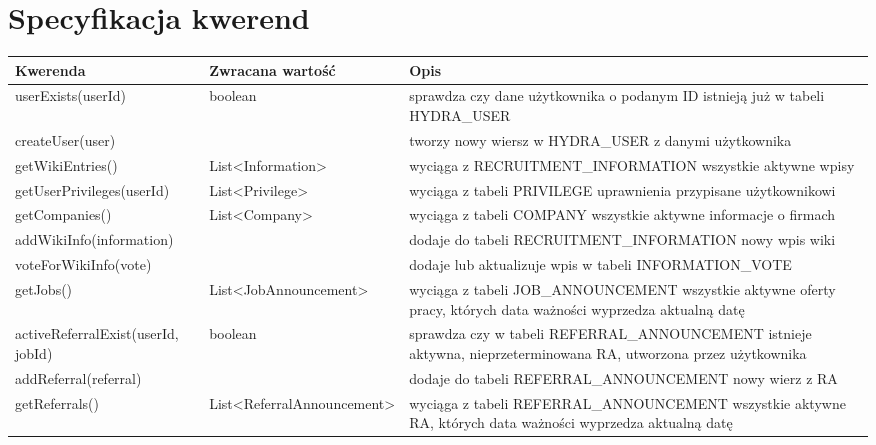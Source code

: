 \documentclass[oneside]{scrreprt}
\begin{document}
\section{Specyfikacja kwerend}
\begin{table}[ht]
	\centering
	\begin{tabular}{p{4.5cm}|p{5cm}|p{7cm}}
		\textbf{Kwerenda} & \textbf{Zwracana wartość} & \textbf{Opis} \\ \hline
		userExists(userId) & boolean & sprawdza czy dane użytkownika o podanym ID istnieją już w tabeli HYDRA\_USER \\ \hline
		createUser(user) &  & tworzy nowy wiersz w HYDRA\_USER z danymi użytkownika \\ \hline
		getWikiEntries() & List\textless{}Information\textgreater{} & wyciąga z RECRUITMENT\_INFORMATION wszystkie aktywne wpisy \\ \hline
		getUserPrivileges(userId) & List\textless{}Privilege\textgreater{} & wyciąga z tabeli PRIVILEGE uprawnienia przypisane użytkownikowi \\ \hline
		getCompanies() & List\textless{}Company\textgreater{} & wyciąga z tabeli COMPANY wszystkie aktywne informacje o firmach \\ \hline
		addWikiInfo(information) &  & dodaje do tabeli RECRUITMENT\_INFORMATION nowy wpis wiki \\ \hline
		voteForWikiInfo(vote) &  & dodaje lub aktualizuje wpis w tabeli INFORMATION\_VOTE \\ \hline
		getJobs() & List\textless{}JobAnnouncement\textgreater{} & wyciąga z tabeli JOB\_ANNOUNCEMENT wszystkie aktywne oferty pracy, których data ważności wyprzedza aktualną datę \\ \hline
		activeReferralExist(userId, jobId) & boolean & sprawdza czy w tabeli REFERRAL\_ANNOUNCEMENT istnieje aktywna, nieprzeterminowana RA, utworzona przez użytkownika \\ \hline
		addReferral(referral) &  & dodaje do tabeli REFERRAL\_ANNOUNCEMENT nowy wierz z RA \\ \hline
		getReferrals() & List\textless{}ReferralAnnouncement\textgreater{} & wyciąga z tabeli REFERRAL\_ANNOUNCEMENT wszystkie aktywne RA, których data ważności wyprzedza aktualną datę
	\end{tabular}
\end{table}
\end{document}
